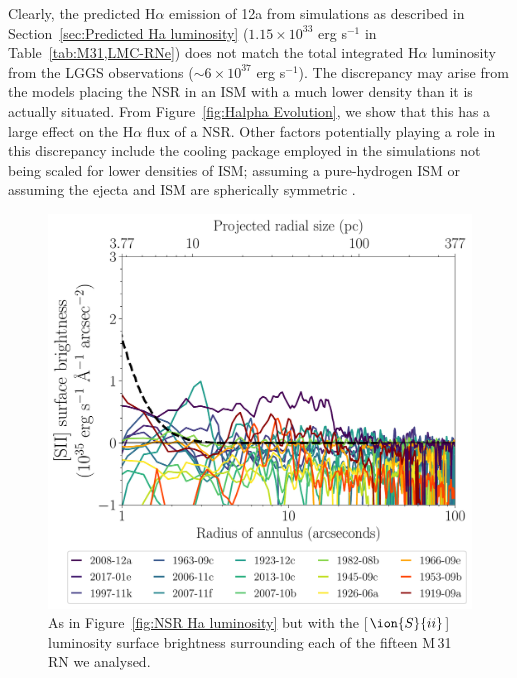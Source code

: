 \documentclass[fleqn,usenatbib]{mnras}
\begin{document}
Clearly, the predicted H$\alpha$ emission of 12a from simulations as described in Section~\ref{sec:Predicted Ha luminosity} ($1.15 \times 10^{33}$ erg s$^{-1}$ in Table~\ref{tab:M31,LMC-RNe}) does not match the total integrated H$\alpha$ luminosity from the LGGS observations (${\sim} 6 \times 10^{37}$ erg s$^{-1}$). The discrepancy may arise from the models placing the NSR in an ISM with a much lower density than it is actually situated. From Figure~\ref{fig:Halpha Evolution}, we show that this has a large effect on the H$\alpha$ flux of a NSR. Other factors potentially playing a role in this discrepancy include the cooling package employed in the \citet{2023MNRAS.521.3004H} simulations not being scaled for lower densities of ISM; assuming a pure-hydrogen ISM or assuming the ejecta and ISM are spherically symmetric \citep{2023arXiv231017258H}.

\begin{figure}
\includegraphics[width=\columnwidth]{Figures/NSR_Radial_SII_Luminosity_All.pdf}
\caption{As in Figure~\ref{fig:NSR Ha luminosity} but with the [$\ion{S}{ii}$] luminosity surface brightness surrounding each of the fifteen M\,31 RN we analysed.}
\label{fig:NSR SII luminosity}
\end{figure}
\end{document}
